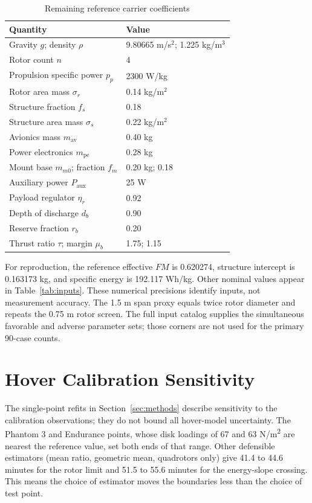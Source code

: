 \documentclass[twocolumn,letterpaper]{IEEEAerospaceCLS}
\begin{document}
\begin{table}[!tb]
\caption{Remaining reference carrier coefficients}
\label{tab:components}
\centering\small
\begin{tabular}{@{}L{1.50in}L{1.45in}@{}}
\toprule
Quantity & Value \\
\midrule
Gravity $g$; density $\rho$ & 9.80665 m/s$^2$; 1.225 kg/m$^3$ \\
Rotor count $n$ & 4 \\
Propulsion specific power $p_p$ & 2300 W/kg \\
Rotor area mass $\sigma_r$ & 0.14 kg/m$^2$ \\
Structure fraction $f_s$ & 0.18 \\
Structure area mass $\sigma_s$ & 0.22 kg/m$^2$ \\
Avionics mass $m_{\mathrm{av}}$ & 0.40 kg \\
Power electronics $m_{\mathrm{pe}}$ & 0.28 kg \\
Mount base $m_{m0}$; fraction $f_m$ & 0.20 kg; 0.18 \\
Auxiliary power $P_{\mathrm{aux}}$ & 25 W \\
Payload regulator $\eta_r$ & 0.92 \\
Depth of discharge $d_b$ & 0.90 \\
Reserve fraction $r_b$ & 0.20 \\
Thrust ratio $\tau$; margin $\mu_b$ & 1.75; 1.15 \\
\bottomrule
\end{tabular}
\end{table}

For reproduction, the reference effective $FM$ is 0.620274, structure intercept is 0.163173 kg, and specific energy is 192.117 Wh/kg. Other nominal values appear in Table~\ref{tab:inputs}. These numerical precisions identify inputs, not measurement accuracy. The 1.5 m span proxy equals twice rotor diameter and repeats the 0.75 m rotor screen. The full input catalog supplies the simultaneous favorable and adverse parameter sets; those corners are not used for the primary 90-case counts.

\section{Hover Calibration Sensitivity}

The single-point refits in Section~\ref{sec:methods} describe sensitivity to the calibration observations; they do not bound all hover-model uncertainty. The Phantom 3 and Endurance points, whose disk loadings of 67 and 63 N/m\textsuperscript{2} are nearest the reference value, set both ends of that range. Other defensible estimators (mean ratio, geometric mean, quadrotors only) give 41.4 to 44.6 minutes for the rotor limit and 51.5 to 55.6 minutes for the energy-slope crossing. This means the choice of estimator moves the boundaries less than the choice of test point.
\end{document}
